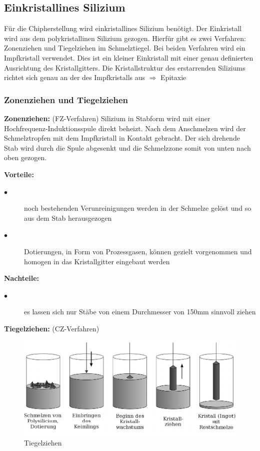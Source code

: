 \subsection{Einkristallines Silizium}
	Für die Chipherstellung wird einkristallines Silizium benötigt. Der Einkristall wird aus dem polykristallinen Silizium gezogen. Hierfür gibt es zwei Verfahren: Zonenziehen und Tiegelziehen im Schmelztiegel. Bei beiden Verfahren wird ein Impfkristall verwendet. Dies ist ein kleiner Einkristall mit einer genau definierten Ausrichtung des Kristallgitters. Die Kristallstruktur des erstarrenden Siliziums richtet sich genau an der des Impfkristalls aus $\Rightarrow$ Epitaxie
	
	\subsubsection{Zonenziehen und Tiegelziehen}
		\textbf{Zonenziehen:} (FZ-Verfahren)
			Silizium in Stabform wird mit einer Hochfrequenz-Induktionsspule direkt beheizt. Nach dem Anschmelzen wird der Schmelztropfen mit dem Impfkristall in Kontakt gebracht. Der sich drehende Stab wird durch die Spule abgesenkt und die Schmelzzone somit von unten nach oben gezogen.
			
			\textbf{Vorteile:}
				\begin{description}
					\item[$\bullet$] noch bestehenden Verunreinigungen werden in der Schmelze gelöst und so aus dem Stab herausgezogen
					\item[$\bullet$] Dotierungen, in Form von Prozessgasen, können gezielt vorgenommen und homogen in das Kristallgitter eingebaut werden
				\end{description}
			\textbf{Nachteile:}
			\begin{description}
				\item[$\bullet$] es lassen sich nur Stäbe von einem Durchmesser von 150mm sinnvoll ziehen
			\end{description}	
				
			
		\textbf{Tiegelziehen:} (CZ-Verfahren)
		
		\begin{figure}[h!]
			\centering
			\includegraphics[width=\textwidth]{Kapitel/Kap02/tiegelziehen.PNG}
			\caption{Tiegelziehen}
			\label{02_tiegelziehen}
		\end{figure}
		

